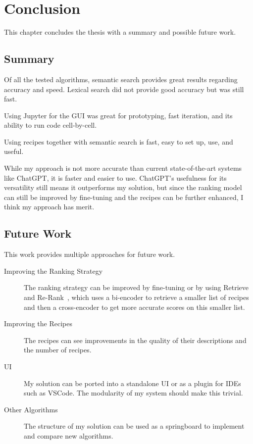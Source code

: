 \documentclass[
     12pt,                    %
     a4paper,             %
     BCOR=10mm,     %
     DIV=14,                 %
     listof=totoc,                    %
     bibliography=totoc,       %
     index=totoc,              %
     twoside,
     headsepline
     ]{scrreprt}
\begin{document}
\chapter{Conclusion}

This chapter concludes the thesis with a summary and possible future work.

\section{Summary}

Of all the tested algorithms, semantic search provides great results regarding accuracy and speed. Lexical search did not provide good accuracy but was still fast.

Using Jupyter for the GUI was great for prototyping, fast iteration, and its ability to run code cell-by-cell.

Using recipes together with semantic search is fast, easy to set up, use, and useful.

While my approach is not more accurate than current state-of-the-art systems like ChatGPT, it is faster and easier to use. ChatGPT's usefulness for its versatility still means it outperforms my solution, but since the ranking model can still be improved by fine-tuning and the recipes can be further enhanced, I think my approach has merit.

\section{Future Work}\label{futurework}

This work provides multiple approaches for future work.

\begin{description}
	\item[Improving the Ranking Strategy] The ranking strategy can be improved by fine-tuning or by using Retrieve and Re-Rank~\cite{retrievererank}, which uses a bi-encoder to retrieve a smaller list of recipes and then a cross-encoder to get more accurate scores on this smaller list.
	\item[Improving the Recipes] The recipes can see improvements in the quality of their descriptions and the number of recipes.
	\item[UI] My solution can be ported into a standalone UI or as a plugin for IDEs such as VSCode. The modularity of my system should make this trivial.
	\item[Other Algorithms] The structure of my solution can be used as a springboard to implement and compare new algorithms.
\end{description}


\printbibliography
\end{document}
